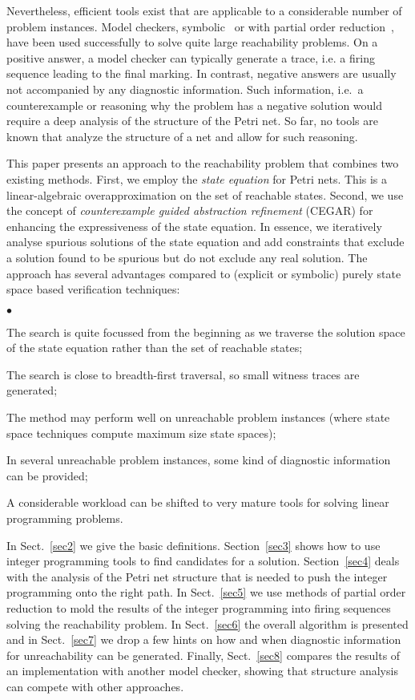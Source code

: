 \documentclass{LMCS}
\begin{document}
Nevertheless, efficient tools exist that are applicable to a considerable number of problem instances.
Model checkers, symbolic~\cite{cms06} or with partial order reduction~\cite{Wolf_2007_icatpn}, have been used
successfully to solve quite large reachability problems. On a positive answer, a model checker can typically generate
a trace, i.e. a firing sequence leading to the final marking. In contrast, negative answers are usually
not accompanied by any diagnostic information. Such information, i.e.\ a counterexample or reasoning
why the problem has a negative solution would require a deep analysis of the structure of the
Petri net. So far, no tools are known that analyze the structure of a net and allow for such
reasoning. 

This paper presents an approach to the reachability problem that combines two existing methods. First,
we employ the {\em state equation} for Petri nets. This is a linear-algebraic overapproximation on the
set of reachable states. Second, we use the concept of {\em counterexample guided abstraction refinement}
(CEGAR) \cite{cegar} for enhancing the expressiveness of the state equation. In essence, we iteratively analyse spurious
solutions of the state equation and add constraints that exclude a solution found to be spurious but do not exclude
any real solution. The approach has several advantages compared to (explicit or symbolic) purely state space based
verification techniques:
\begin{iteMize}{$\bullet$}
\item The search is quite focussed from the beginning as we traverse the solution space of the state equation rather than the set of reachable states;
\item The search is close to breadth-first traversal, so small witness traces are generated;
\item The method may perform well on unreachable problem instances (where state space techniques compute maximum size state spaces);
\item In several unreachable problem instances, some kind of diagnostic information can be provided; 
\item A considerable workload can be shifted to very mature tools for solving linear programming problems.
\end{iteMize}

\noindent In Sect.~\ref{sec2} we give the basic
definitions. Section~\ref{sec3} shows how to use integer programming tools to find candidates
for a solution. Section~\ref{sec4} deals with the analysis of the Petri net structure that
is needed to push the integer programming onto the right path. In Sect.~\ref{sec5} we
use methods of partial order reduction to mold the results of the integer programming
into firing sequences solving the reachability problem. 
In Sect.~\ref{sec6} the overall algorithm is presented and in Sect.~\ref{sec7} we drop
a few hints on how and when diagnostic information for unreachability can be generated.
Finally, Sect.~\ref{sec8} compares the results of an implementation
with another model checker, showing that structure analysis can compete with other approaches.
\end{document}
